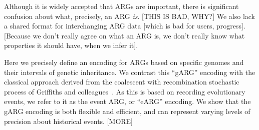 \documentclass{article}
\begin{document}
Although it is widely accepted that ARGs are important, there is significant
confusion about what, precisely, an ARG \emph{is}. [THIS IS BAD, WHY?]
We also lack a shared format for interchanging ARG data [which is bad
for users, progress]. [Because we don't really agree on what an ARG is,
we don't really know what properties it should have, when we infer it].

Here we precisely define an encoding for ARGs based on specific genomes
and their intervals of genetic inheritance. We contrast this ``gARG''
encoding with the classical approach derived from the coalescent
with recombination stochastic process of Griffiths
and colleagues~\citep{griffiths1991two,ethier1990two,
griffiths1996ancestral,griffiths1997ancestral}. As this is based
on recording evolutionary events, we refer to it as the event ARG, or
``eARG'' encoding.
We show that the gARG encoding is both flexible and efficient,
and can represent varying levels of precision about historical
events.
[MORE]


\end{document}
